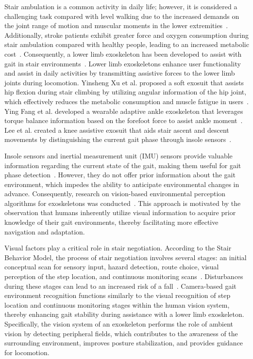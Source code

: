 \documentclass[actuators,article,accept,pdftex,moreauthors]{Definitions/mdpi}
\begin{document}
Stair ambulation is a common activity in daily life; however, it is considered a challenging task compared with level walking due to the increased demands on the joint range of motion and muscular moments in the lower extremities~\cite{Andriacchi1980}. Additionally, stroke patients exhibit greater force and oxygen consumption during stair ambulation compared with healthy people, leading to an increased metabolic cost~\cite{Jacobs2016,Novak2012}.
Consequently, a lower limb exoskeleton has been developed to assist with gait in stair environments~\cite{Hsu2021,Lee2022,Bishe2021}. Lower limb exoskeletons enhance user functionality and assist in daily activities by transmitting assistive forces to the lower limb joints during locomotion. Yinsheng Xu et al. proposed a soft exosuit that assists hip flexion during stair climbing by utilizing angular information of the hip joint, which effectively reduces the metabolic consumption and muscle fatigue in users~\cite{Xu2023}. Ying Fang et al. developed a wearable adaptive ankle exoskeleton that leverages torque balance information based on the forefoot force to assist ankle moment~\cite{Fang2021}. Lee et al. created a knee assistive exosuit that aids stair ascent and descent movements by distinguishing the current gait phase through insole sensors~\cite{Lee2020}.

Insole sensors and inertial measurement unit (IMU) sensors provide valuable information regarding the current state of the gait, making them useful for gait phase detection~\cite{Han2019,Pappas2001}. However, they do not offer prior information about the gait environment, which impedes the ability to anticipate environmental changes in advance. Consequently, research on vision-based environmental perception algorithms for exoskeletons was conducted~\cite{Liu2019,Yang2023}. This approach is motivated by the observation that humans inherently utilize visual information to acquire prior knowledge of their gait environments, thereby facilitating more effective navigation and adaptation.

Visual factors play a critical role in stair negotiation. According to the Stair Behavior Model, the process of stair negotiation involves several stages: an initial conceptual scan for sensory input, hazard detection, route choice, visual perception of the step location, and continuous monitoring scans~\cite{Templer1995}. Disturbances during these stages can lead to an increased risk of a fall~\cite{Coleman2004}. Camera-based gait environment recognition functions similarly to the visual recognition of step location and continuous monitoring stages within the human vision system, thereby enhancing gait stability during assistance with a lower limb exoskeleton. Specifically, the vision system of an exoskeleton performs the role of ambient vision by detecting peripheral fields, which contributes to the awareness of the surrounding environment, improves posture stabilization, and provides guidance for locomotion.
\end{document}

